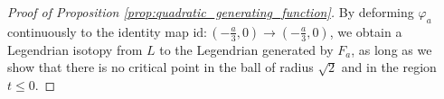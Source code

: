 \documentclass[reqno]{amsart}
\renewcommand{\epsilon}{\varepsilon}
\theoremstyle{theorem}
\newtheorem{lemma}[corollary]{Lemma}
\theoremstyle{remark}
\theoremstyle{definition}
\newcommand{\del}{\partial}
\begin{document}
\begin{proof}[Proof of Proposition \ref{prop:quadratic_generating_function}]




By deforming $\varphi_a$ continuously to the identity map $\text{id}:(-\frac{a}{3},0) \to (-\frac{a}{3},0)$, we obtain
a Legendrian isotopy from $L$ to the Legendrian generated by $F_a$, as long as we show that there is no critical point in the ball of radius $\sqrt{2}$ and in the region $t \leq 0$.  %





\end{proof}
\end{document}
